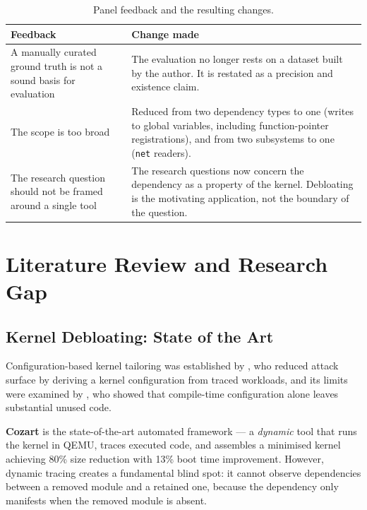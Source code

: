 \documentclass[12pt, a4paper, oneside]{book}
\begin{document}
\begin{table}[H]
\centering
\caption{Panel feedback and the resulting changes.}
\renewcommand{\arraystretch}{1.5}
\begin{tabularx}{\textwidth}{L{4.6cm} L{8.2cm}}
\toprule
\textbf{Feedback} & \textbf{Change made} \\
\midrule
A manually curated ground truth is not a sound basis for evaluation &
  The evaluation no longer rests on a dataset built by the author. It is
  restated as a precision and existence claim. \\
\addlinespace
The scope is too broad &
  Reduced from two dependency types to one (writes to global variables,
  including function-pointer registrations), and from two subsystems to one
  (\texttt{net} readers). \\
\addlinespace
The research question should not be framed around a single tool &
  The research questions now concern the dependency as a property of the kernel.
  Debloating is the motivating application, not the boundary of the question. \\
\bottomrule
\end{tabularx}
\end{table}

\chapter{Literature Review and Research Gap}

\section{Kernel Debloating: State of the Art}

Configuration-based kernel tailoring was established by \citet{kurmus2013attack},
who reduced attack surface by deriving a kernel configuration from traced
workloads, and its limits were examined by \citet{alharthi2018effectiveness},
who showed that compile-time configuration alone leaves substantial unused code.

\textbf{Cozart} \citep{kuo2020cozart, kuo2022cacm} is the state-of-the-art
automated framework --- a \textit{dynamic} tool that runs the kernel in QEMU,
traces executed code, and assembles a minimised kernel achieving 80\% size
reduction with 13\% boot time improvement. However, dynamic tracing creates a
fundamental blind spot: it cannot observe dependencies between a removed module
and a retained one, because the dependency only manifests when the removed
module is absent.
\end{document}
